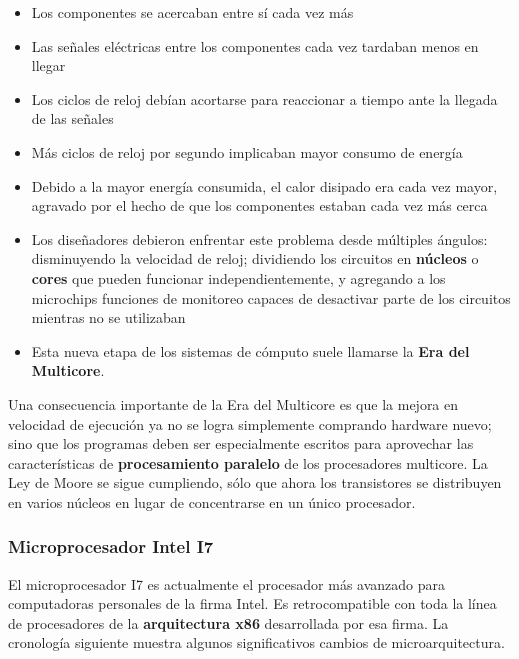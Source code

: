 \documentclass[spanish,A4,]{article}
\begin{document}
\begin{itemize}
\itemsep1pt\parskip0pt
\item
  Los componentes se acercaban entre sí cada vez más
\item
  Las señales eléctricas entre los componentes cada vez tardaban menos
  en llegar
\item
  Los ciclos de reloj debían acortarse para reaccionar a tiempo ante la
  llegada de las señales
\item
  Más ciclos de reloj por segundo implicaban mayor consumo de energía
\item
  Debido a la mayor energía consumida, el calor disipado era cada vez
  mayor, agravado por el hecho de que los componentes estaban cada vez
  más cerca
\item
  Los diseñadores debieron enfrentar este problema desde múltiples
  ángulos: disminuyendo la velocidad de reloj; dividiendo los circuitos
  en \textbf{núcleos} o \textbf{cores} que pueden funcionar
  independientemente, y agregando a los microchips funciones de
  monitoreo capaces de desactivar parte de los circuitos mientras no se
  utilizaban
\item
  Esta nueva etapa de los sistemas de cómputo suele llamarse la
  \textbf{Era del Multicore}.
\end{itemize}

Una consecuencia importante de la Era del Multicore es que la mejora en
velocidad de ejecución ya no se logra simplemente comprando hardware
nuevo; sino que los programas deben ser especialmente escritos para
aprovechar las características de \textbf{procesamiento paralelo} de los
procesadores multicore. La Ley de Moore se sigue cumpliendo, sólo que
ahora los transistores se distribuyen en varios núcleos en lugar de
concentrarse en un único procesador.

\subsubsection{Microprocesador Intel I7}\label{microprocesador-intel-i7}

El microprocesador I7 es actualmente el procesador más avanzado para
computadoras personales de la firma Intel. Es retrocompatible con toda
la línea de procesadores de la \textbf{arquitectura x86} desarrollada
por esa firma. La cronología siguiente muestra algunos significativos
cambios de microarquitectura.
\end{document}
